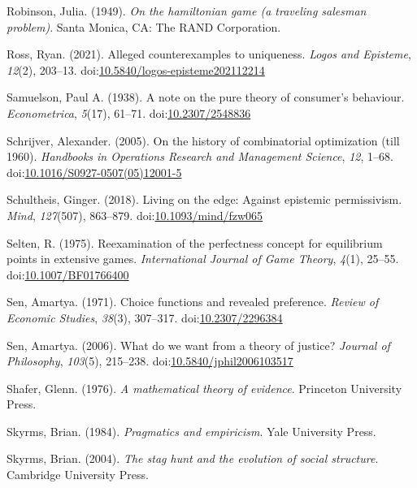 \documentclass[
  12pt,
  letterpaper,
  DIV=11,
  numbers=noendperiod]{scrreprt}
\newlength{\cslhangindent}
\newenvironment{CSLReferences}[2] %
 {\begin{list}{}{%
  \setlength{\itemindent}{0pt}
  \setlength{\leftmargin}{0pt}
  \setlength{\parsep}{0pt}
  \ifodd #1
   \setlength{\leftmargin}{\cslhangindent}
   \setlength{\itemindent}{-1\cslhangindent}
  \fi
  \setlength{\itemsep}{#2\baselineskip}}}
 {\end{list}}
\begin{document}
\begin{CSLReferences}{1}{0}
Robinson, Julia. (1949). \emph{On the hamiltonian game (a traveling
salesman problem)}. Santa Monica, CA: The RAND Corporation.

Ross, Ryan. (2021). Alleged counterexamples to uniqueness. \emph{Logos
and Episteme}, \emph{12}(2), 203--13.
doi:\href{https://doi.org/10.5840/logos-episteme202112214}{10.5840/logos-episteme202112214}

Samuelson, Paul A. (1938). A note on the pure theory of consumer's
behaviour. \emph{Econometrica}, \emph{5}(17), 61--71.
doi:\href{https://doi.org/10.2307/2548836}{10.2307/2548836}

Schrijver, Alexander. (2005). On the history of combinatorial
optimization (till 1960). \emph{Handbooks in Operations Research and
Management Science}, \emph{12}, 1--68.
doi:\href{https://doi.org/10.1016/S0927-0507(05)12001-5}{10.1016/S0927-0507(05)12001-5}

Schultheis, Ginger. (2018). Living on the edge: Against epistemic
permissivism. \emph{Mind}, \emph{127}(507), 863--879.
doi:\href{https://doi.org/10.1093/mind/fzw065}{10.1093/mind/fzw065}

Selten, R. (1975). Reexamination of the perfectness concept for
equilibrium points in extensive games. \emph{International Journal of
Game Theory}, \emph{4}(1), 25--55.
doi:\href{https://doi.org/10.1007/BF01766400}{10.1007/BF01766400}

Sen, Amartya. (1971). Choice functions and revealed preference.
\emph{Review of Economic Studies}, \emph{38}(3), 307--317.
doi:\href{https://doi.org/10.2307/2296384}{10.2307/2296384}

Sen, Amartya. (2006). What do we want from a theory of justice?
\emph{Journal of Philosophy}, \emph{103}(5), 215--238.
doi:\href{https://doi.org/10.5840/jphil2006103517}{10.5840/jphil2006103517}

Shafer, Glenn. (1976). \emph{A mathematical theory of evidence}.
Princeton University Press.

Skyrms, Brian. (1984). \emph{Pragmatics and empiricism}. Yale University
Press.

Skyrms, Brian. (2004). \emph{The stag hunt and the evolution of social
structure}. {C}ambridge {U}niversity {P}ress.


\end{CSLReferences}
\end{document}

